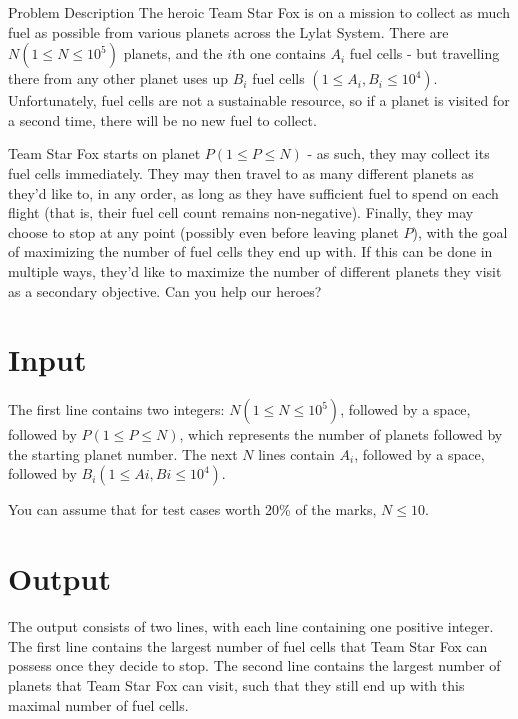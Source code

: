 
Problem Description The heroic Team Star Fox is on a mission to collect as much fuel as possible from various planets across the Lylat System. There are $N (1 \leq N \leq 10^5)$ planets, and the $i$th one contains $A_i$ fuel cells - but travelling there from any other planet uses up $B_i$ fuel cells $(1 \leq A_i,B_i \leq 10^4)$. Unfortunately, fuel cells are not a sustainable resource, so if a planet is visited for a second time, there will be no new fuel to collect.

Team Star Fox starts on planet $P (1 \leq P \leq N)$ - as such, they may collect its fuel cells immediately. They may then travel to as many different planets as they'd like to, in any order, as long as they have sufficient fuel to spend on each flight (that is, their fuel cell count remains non-negative). Finally, they may choose to stop at any point (possibly even before leaving planet $P$), with the goal of maximizing the number of fuel cells they end up with. If this can be done in multiple ways, they'd like to maximize the number of different planets they visit as a secondary objective. Can you help our heroes? 

\section*{Input}
The first line contains two integers: $N (1 \leq N \leq 10^5)$, followed by a space, followed by $P (1 \leq P \leq N)$, which represents the number of planets followed by the starting planet number. The next $N$ lines contain $A_i$, followed by a space, followed by $B_i (1 \leq Ai,Bi \leq 10^4)$.

You can assume that for test cases worth 20\% of the marks, $N \leq 10$.

\section*{Output}

The output consists of two lines, with each line containing one positive integer. The first line contains the largest number of fuel cells that Team Star Fox can possess once they decide to stop. The second line contains the largest number of planets that Team Star Fox can visit, such that they still end up with this maximal number of fuel cells.